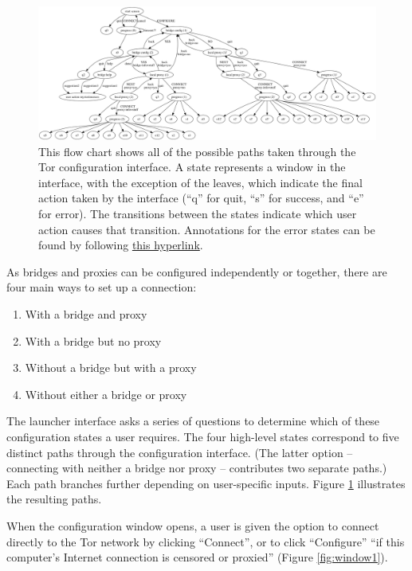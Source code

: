 \documentclass{template}
\begin{document}
\begin{figure}[t]
\label{fig:interface}
  \centering
    \includegraphics[width=\textwidth]{../torconfig.png}
    \caption{This flow chart shows all of the possible paths taken through the
    Tor configuration interface. A state represents a window in the interface,
    with the exception of the leaves, which indicate the final action taken by
    the interface (``q'' for quit, ``s'' for success, and ``e'' for error). The
    transitions between the states indicate which user action causes that
    transition. Annotations for the error states can be found by following
\href{https://github.com/lindanlee/circumvention-ux-tor/blob/master/torconfig.dot}{this hyperlink}.}
\end{figure}

As bridges and proxies can be configured independently or together, there are
four main ways to set up a connection:

\begin{enumerate} \itemsep1pt \parskip0pt 
    \item With a bridge and proxy
    \item With a bridge but no proxy
    \item Without a bridge but with a proxy
    \item Without either a bridge or proxy
\end{enumerate}

The launcher interface asks a series of questions to
determine which of these configuration states a user requires.
The four high-level states correspond to five distinct paths through the
configuration interface. (The latter option -- connecting with neither a bridge
nor proxy -- contributes two separate paths.) Each path branches further
depending on user-specific inputs. Figure \ref{fig:interface} illustrates the
resulting paths. 

When the configuration window opens, a user is given the option to connect
directly to the Tor network by clicking ``Connect'', or to click ``Configure''
``if this computer's Internet connection is censored or proxied'' (Figure
\ref{fig:window1}).
\end{document}
